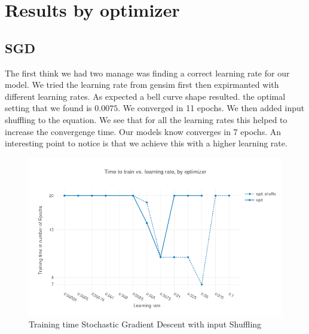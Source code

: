 \section{Results by optimizer}
\subsection{SGD}
The first think we had two manage was finding a correct learning rate for our model. We tried the learning rate from gensim first then expirmanted with different learning rates. As expected a bell curve shape resulted. the optimal setting that we found is $0.0075$. We converged in 11 epochs. 
We then added input shuffling to the equation. We see that for all the learning rates this helped to increase the convergenge time. Our models know converges in 7 epochs. An interesting point to notice is that we achieve this with a higher learning rate. 
\begin{figure}[h]
    \centering
			\includegraphics[scale=0.45]{images/results_sgd_shuffle} 
    \caption{Training time Stochastic Gradient Descent with input Shuffling}
    \label{fig:results_sgd}
\end{figure}
